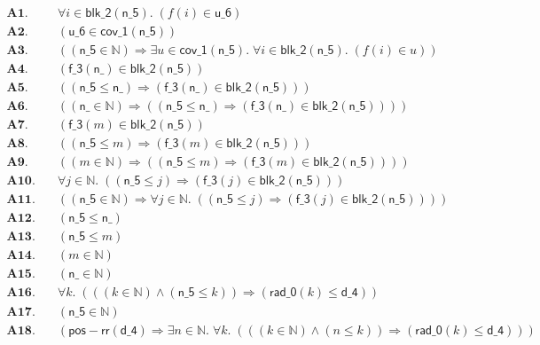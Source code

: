 \documentclass[11pt]{article}
\begin{document}
\begin{align*}
  \mathbf{A1.}\quad & \forall i \in \mathsf{blk\_2}(\mathsf{n\_5}).\; (f(i) \in \mathsf{u\_6}) \\
  \mathbf{A2.}\quad & (\mathsf{u\_6} \in \mathsf{cov\_1}(\mathsf{n\_5})) \\
  \mathbf{A3.}\quad & ((\mathsf{n\_5} \in \mathbb{N}) \Rightarrow \exists u \in \mathsf{cov\_1}(\mathsf{n\_5}).\; \forall i \in \mathsf{blk\_2}(\mathsf{n\_5}).\; (f(i) \in u)) \\
  \mathbf{A4.}\quad & (\mathsf{f\_3}(\mathsf{n\_}) \in \mathsf{blk\_2}(\mathsf{n\_5})) \\
  \mathbf{A5.}\quad & ((\mathsf{n\_5} \leq \mathsf{n\_}) \Rightarrow (\mathsf{f\_3}(\mathsf{n\_}) \in \mathsf{blk\_2}(\mathsf{n\_5}))) \\
  \mathbf{A6.}\quad & ((\mathsf{n\_} \in \mathbb{N}) \Rightarrow ((\mathsf{n\_5} \leq \mathsf{n\_}) \Rightarrow (\mathsf{f\_3}(\mathsf{n\_}) \in \mathsf{blk\_2}(\mathsf{n\_5})))) \\
  \mathbf{A7.}\quad & (\mathsf{f\_3}(m) \in \mathsf{blk\_2}(\mathsf{n\_5})) \\
  \mathbf{A8.}\quad & ((\mathsf{n\_5} \leq m) \Rightarrow (\mathsf{f\_3}(m) \in \mathsf{blk\_2}(\mathsf{n\_5}))) \\
  \mathbf{A9.}\quad & ((m \in \mathbb{N}) \Rightarrow ((\mathsf{n\_5} \leq m) \Rightarrow (\mathsf{f\_3}(m) \in \mathsf{blk\_2}(\mathsf{n\_5})))) \\
  \mathbf{A10.}\quad & \forall j \in \mathbb{N}.\; ((\mathsf{n\_5} \leq j) \Rightarrow (\mathsf{f\_3}(j) \in \mathsf{blk\_2}(\mathsf{n\_5}))) \\
  \mathbf{A11.}\quad & ((\mathsf{n\_5} \in \mathbb{N}) \Rightarrow \forall j \in \mathbb{N}.\; ((\mathsf{n\_5} \leq j) \Rightarrow (\mathsf{f\_3}(j) \in \mathsf{blk\_2}(\mathsf{n\_5})))) \\
  \mathbf{A12.}\quad & (\mathsf{n\_5} \leq \mathsf{n\_}) \\
  \mathbf{A13.}\quad & (\mathsf{n\_5} \leq m) \\
  \mathbf{A14.}\quad & (m \in \mathbb{N}) \\
  \mathbf{A15.}\quad & (\mathsf{n\_} \in \mathbb{N}) \\
  \mathbf{A16.}\quad & \forall k.\; (((k \in \mathbb{N}) \wedge (\mathsf{n\_5} \leq k)) \Rightarrow (\mathsf{rad\_0}(k) \leq \mathsf{d\_4})) \\
  \mathbf{A17.}\quad & (\mathsf{n\_5} \in \mathbb{N}) \\
  \mathbf{A18.}\quad & (\mathsf{pos{-}rr}(\mathsf{d\_4}) \Rightarrow \exists n \in \mathbb{N}.\; \forall k.\; (((k \in \mathbb{N}) \wedge (n \leq k)) \Rightarrow (\mathsf{rad\_0}(k) \leq \mathsf{d\_4}))) \\

\end{align*}
\end{document}
